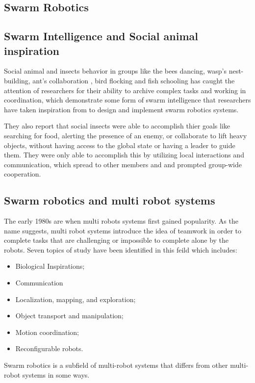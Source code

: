 \documentclass[12pt]{extarticle}
\begin{document}
\newpage
\pagebreak
\hspace{0pt}
\vfill
\begin{center}
\section{Swarm Robotics}
\end{center}
\vfill
\hspace{0pt}
\pagebreak




                  
\subsection{Swarm Intelligence and Social animal inspiration}
Social animal and insects behavior in groups like the bees dancing, wasp’s nest-building, ant's collaboration , bird flocking and fish schooling  has caught the attention of researchers for their ability to archive complex tasks and working in coordination, which demonstrate some form of swarm intelligence  that researchers have taken inspiration from to design and implement swarm robotics systems.\cite{navarro2013introduction} 

They also report that social insects were able to accomplish thier goals like searching for food, alerting the presence of an enemy, or collaborate to lift heavy objects, without having access to the global state or having a leader to guide them. They were only able to accomplish this by utilizing local interactions and communication, which spread to other members and and prompted group-wide cooperation.\cite{navarro2013introduction} 



\subsection{Swarm robotics and multi robot systems}
The early 1980s are when multi robots systems first gained popularity.
As the name suggests, multi robot systems introduce the idea of teamwork in order to complete tasks that are challenging or impossible to complete alone by the robots.
Seven topics of study have been identified in this feild which includes:
\begin{itemize}
  \item  Biological Inspirations; 
  \item Communication
  \item Localization, mapping, and exploration;
  \item Object transport and manipulation;
  \item Motion coordination; 
  \item Reconfigurable robots.
\end{itemize}
Swarm robotics is a subfield of multi-robot systems that differs from other multi-robot systems in some ways.\cite{arai2002advances}
   
\end{document}
